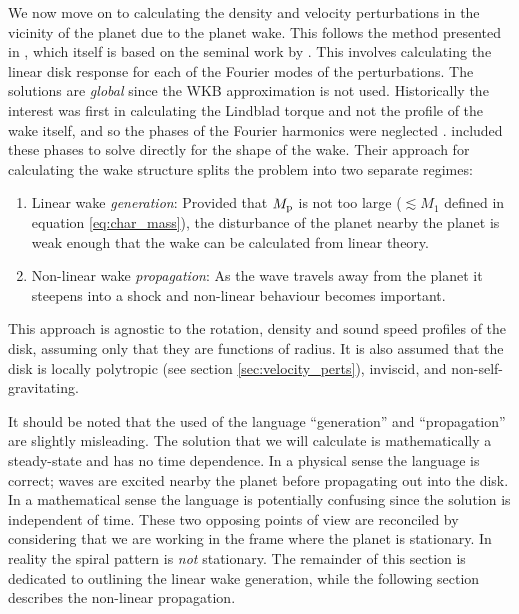 We now move on to calculating the density and velocity perturbations in the vicinity of the planet due to the planet wake.
This follows the method presented in \citet{goodman2001,rafikov2002a}, which itself is based on the seminal work by \citet{goldreich1978,goldreich1980}.
This involves calculating the linear disk response for each of the Fourier modes of the perturbations.
The solutions are \textit{global} since the WKB approximation is not used.
Historically the interest was first in calculating the Lindblad torque and not the profile of the wake itself, and so the phases of the Fourier harmonics were neglected \citep{goldreich1978,goldreich1980,artymowicz1993a,ward1997}.
\citet{goodman2001} included these phases to solve directly for the shape of the wake.
Their approach for calculating the wake structure splits the problem into two separate regimes: 
\begin{enumerate}
    \item Linear wake \textit{generation}: Provided that $M_{\rm p}$ is not too large ($\lesssim M_1$ defined in equation \ref{eq:char_mass}), the disturbance of the planet nearby the planet is weak enough that the wake can be calculated from linear theory.
    \item Non-linear wake \textit{propagation}: As the wave travels away from the planet it steepens into a shock and non-linear behaviour becomes important.  
\end{enumerate}
This approach is agnostic to the rotation, density and sound speed profiles of the disk, assuming only that they are functions of radius.
It is also assumed that the disk is locally polytropic (see section \ref{sec:velocity_perts}), inviscid, and non-self-gravitating.

It should be noted that the used of the language ``generation'' and ``propagation'' are slightly misleading.
The solution that we will calculate is mathematically a steady-state and has no time dependence.
In a physical sense the language is correct; waves are excited nearby the planet before propagating out into the disk.
In a mathematical sense the language is potentially confusing since the solution is independent of time.
These two opposing points of view are reconciled by considering that we are working in the frame where the planet is stationary. 
In reality the spiral pattern is \textit{not} stationary.
The remainder of this section is dedicated to outlining the linear wake generation, while the following section describes the non-linear propagation.


